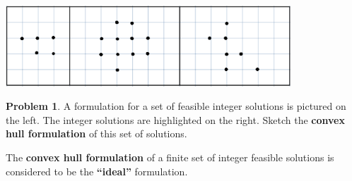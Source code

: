\documentclass[11pt]{article}
\theoremstyle{definition}
\newtheorem{problem}{Problem}
\begin{document}
\begin{center}
\includegraphics[width=0.8\textwidth]{convex_hull_practice.png}
\end{center}
\begin{problem} A formulation for a set of feasible integer solutions is pictured on the left.  The integer solutions are highlighted on the right.  Sketch the \textbf{convex hull formulation} of this set of solutions.

\vspace{0.5cm}
\begin{center}
\begin{minipage}{6.5in}
\centering
{}
\hspace*{0.2in}
\end{minipage}
\end{center}
\end{problem}

\vfill
\begin{tcolorbox}
The \textbf{convex hull formulation} of a finite set of integer feasible solutions is considered to be the \textbf{``ideal''} formulation.
\end{tcolorbox}
\end{document}
